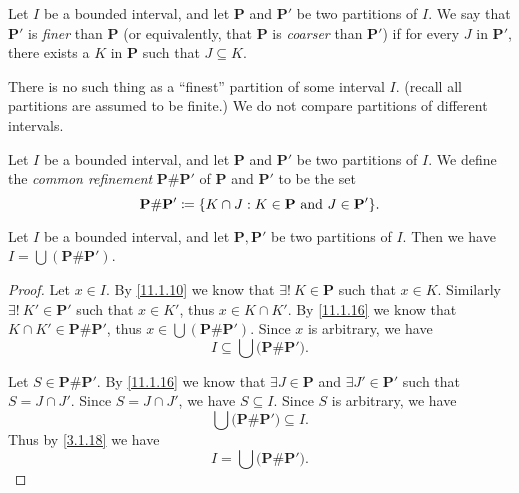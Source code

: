 \begin{defn}\label{11.1.14}
  Let \(I\) be a bounded interval, and let \(\mathbf{P}\) and \(\mathbf{P}'\) be two partitions of \(I\).
  We say that \(\mathbf{P}'\) is \emph{finer} than \(\mathbf{P}\) (or equivalently, that \(\mathbf{P}\) is \emph{coarser} than \(\mathbf{P}'\)) if for every \(J\) in \(\mathbf{P}'\), there exists a \(K\) in \(\mathbf{P}\) such that \(J \subseteq K\).
\end{defn}

\begin{note}
  There is no such thing as a ``finest'' partition of some interval \(I\).
  (recall all partitions are assumed to be finite.)
  We do not compare partitions of different intervals.
\end{note}

\setcounter{thm}{15}
\begin{defn}\label{11.1.16}
  Let \(I\) be a bounded interval, and let \(\mathbf{P}\) and \(\mathbf{P}'\) be two partitions of \(I\).
  We define the \emph{common refinement} \(\mathbf{P} \# \mathbf{P}'\) of \(\mathbf{P}\) and \(\mathbf{P}'\) to be the set
  \[
    \mathbf{P} \# \mathbf{P}' \coloneqq \set{K \cap J : K \in \mathbf{P} \text{ and } J \in \mathbf{P}'}.
  \]
\end{defn}

\begin{ac}\label{ac:11.1.1}
  Let \(I\) be a bounded interval, and let \(\mathbf{P}, \mathbf{P}'\) be two partitions of \(I\).
  Then we have \(I = \bigcup (\mathbf{P} \# \mathbf{P}')\).
\end{ac}

\begin{proof}
  Let \(x \in I\).
  By \cref{11.1.10} we know that \(\exists!\ K \in \mathbf{P}\) such that \(x \in K\).
  Similarly \(\exists!\ K' \in \mathbf{P}'\) such that \(x \in K'\), thus \(x \in K \cap K'\).
  By \cref{11.1.16} we know that \(K \cap K' \in \mathbf{P} \# \mathbf{P}'\), thus \(x \in \bigcup (\mathbf{P} \# \mathbf{P}')\).
  Since \(x\) is arbitrary, we have
  \[
    I \subseteq \bigcup \big(\mathbf{P} \# \mathbf{P}'\big).
  \]

  Let \(S \in \mathbf{P} \# \mathbf{P}'\).
  By \cref{11.1.16} we know that \(\exists J \in \mathbf{P}\) and \(\exists J' \in \mathbf{P}'\) such that \(S = J \cap J'\).
  Since \(S = J \cap J'\), we have \(S \subseteq I\).
  Since \(S\) is arbitrary, we have
  \[
    \bigcup \big(\mathbf{P} \# \mathbf{P}'\big) \subseteq I.
  \]
  Thus by \cref{3.1.18} we have
  \[
    I = \bigcup \big(\mathbf{P} \# \mathbf{P}'\big).
  \]
\end{proof}

